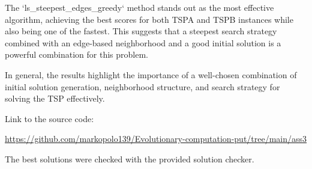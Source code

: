 \documentclass{article}
\begin{document}
The `ls\_steepest\_edges\_greedy` method stands out as the most effective algorithm, achieving the best scores for both TSPA and TSPB instances while also being one of the fastest. This suggests that a steepest search strategy combined with an edge-based neighborhood and a good initial solution is a powerful combination for this problem.

In general, the results highlight the importance of a well-chosen combination of initial solution generation, neighborhood structure, and search strategy for solving the TSP effectively.

Link to the source code:

\url{https://github.com/markopolo139/Evolutionary-computation-put/tree/main/ass3}

The best solutions were checked with the provided solution checker.
\end{document}
